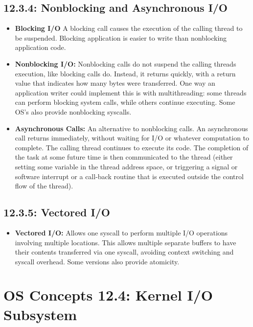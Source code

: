 \documentclass[12pt]{article}
\begin{document}
\subsection*{12.3.4: Nonblocking and Asynchronous I/O}

\begin{itemize}
    \item \textbf{Blocking I/O} A blocking call causes the execution of the calling thread to be suspended. Blocking application is easier to write than nonblocking application code.
    \item \textbf{Nonblocking I/O:} Nonblocking calls do not suspend the calling threads execution, like blocking calls do. Instead, it returns quickly, with a return value that indicates how many bytes were transferred. One way an application writer could implement this is with multithreading: some threads can perform blocking system calls, while others continue executing. Some OS's also provide nonblocking syscalls.
    \item \textbf{Asynchronous Calls:} An alternative to nonblocking calls. An asynchronous call returns immediately, without waiting for I/O or whatever computation to complete. The calling thread continues to execute its code. The completion of the task at some future time is then communicated to the thread (either setting some variable in the thread address space, or triggering a signal or software interrupt or a call-back routine that is executed outside the control flow of the thread).
\end{itemize}

\subsection*{12.3.5: Vectored I/O}

\begin{itemize}
    \item \textbf{Vectored I/O:} Allows one syscall to perform multiple I/O operations involving multiple locations. This allows multiple separate buffers to have their contents transferred via one syscall, avoiding context switching and syscall overhead. Some versions also provide atomicity.
\end{itemize}

\section*{OS Concepts 12.4: Kernel I/O Subsystem}
\end{document}
